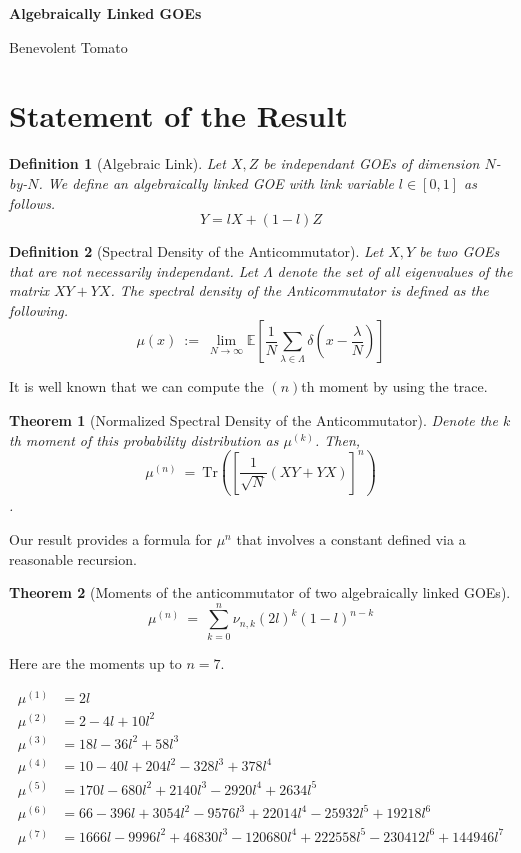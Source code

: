 \documentclass{article}
\newcommand{\Tr}{\textrm{Tr}}
\newtheorem{theorem}{Theorem}
\newtheorem{definition}{Definition}
\begin{document}
\begin{center}
    \Large
    \textbf{Algebraically Linked GOEs}

    \large
    Benevolent Tomato
\end{center}

\section{Statement of the Result} 
\begin{definition}[Algebraic Link]
    Let $X, Z$ be independant GOEs of dimension $N$-by-$N$. We define 
    an algebraically linked GOE with link variable $l \in [0, 1]$ 
    as follows. 
    \[
        Y = l X + (1-l) Z
    \]
\end{definition}

\begin{definition}[Spectral Density of the Anticommutator]
    Let $X, Y$ be two GOEs that are not necessarily independant. 
    Let $\Lambda$ denote the set of all eigenvalues of the matrix 
    $XY + YX$. The spectral density of the Anticommutator 
    is defined as the following. 
    \[
    \mu(x) \ := \ 
    \lim_{N \rightarrow \infty} \mathbb{E}\left[
    \frac 1 N \sum_{\lambda \in \Lambda} 
    \delta\left(
        x - \frac \lambda N
    \right)
    \right]
    \]
    
\end{definition}

It is well known that we can compute the $(n)$th moment 
by using the trace. 

\begin{theorem}[Normalized Spectral Density of the Anticommutator]
    Denote the $k$th moment of this probability 
    distribution as $\mu^{(k)}$. Then, 
    \[
    \mu^{(n)} \ = \ \Tr \left(\left[\frac 1 {\sqrt N}(XY+YX)\right]^n\right)
    \].
\end{theorem}

Our result provides a formula for $\mu^{n}$ that involves 
a constant defined via a reasonable recursion. 

\begin{theorem}[Moments of the anticommutator of two algebraically linked GOEs]
    \[ \mu^{(n)} \ = \ 
    \sum_{k = 0}^n \nu_{n, k} (2l)^{k} (1 - l)^{n - k} 
    \] 
\end{theorem}

Here are the moments up to $n = 7$. 

\begin{align*}
\mu^{(1)} &= 2 l \\
\mu^{(2)} &= 2 - 4 l + 10 l^2 \\
\mu^{(3)} &= 18 l - 36 l^2 + 58 l^3 \\
\mu^{(4)} &= 10 - 40 l + 204 l^2 - 328 l^3 + 378 l^4 \\
\mu^{(5)} &= 170 l - 680 l^2 + 2140 l^3 - 2920 l^4 + 2634 l^5 \\
\mu^{(6)} &= 66 - 396 l + 3054 l^2 - 9576 l^3 + 22014 l^4 - 25932 l^5 + 19218 l^6 \\
\mu^{(7)} &= 1666 l - 9996 l^2 + 46830 l^3 - 120680 l^4 + 222558 l^5 - 230412 l^6 + 144946 l^7
\end{align*}
\end{document}
